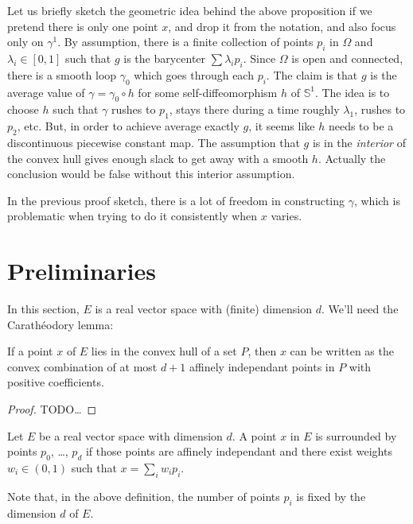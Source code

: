 Let us briefly sketch the geometric idea behind the above proposition
if we pretend there is only one point $x$, and drop it from the
notation, and also focus only on $γ^1$.
By assumption, there is a finite collection of points $p_i$ in $Ω$ and $λ_i ∈
[0, 1]$ such that $g$ is the barycenter $\sum λ_i p_i$. Since $Ω$ is open and
connected, there is a smooth loop $γ_0$ which goes through each $p_i$. The
claim is that $g$ is the average value of $γ = γ_0 ∘ h$ for some
self-diffeomorphism $h$ of $𝕊^1$. The idea is to choose $h$ such that
$γ$ rushes to $p_1$, stays there during a time roughly $λ_1$, rushes to
$p_2$, etc. But, in order to achieve average exactly $g$, it seems like $h$
needs to be a discontinuous piecewise constant map. The assumption that $g$ is
in the \emph{interior} of the convex hull gives enough slack to get away with
a smooth $h$.  Actually the
conclusion would be false without this interior assumption.

In the previous proof sketch, there is a lot of freedom in constructing $γ$,
which is problematic when trying to do it consistently when $x$ varies.

\section{Preliminaries}
\label{sec:preliminaries}

In this section, $E$ is a real vector space with (finite) dimension $d$.
We'll need the Carathéodory lemma:

\begin{lemma}
\label{lem:caratheodory}
  If a point $x$ of $E$ lies in the convex hull of a set $P$, then $x$
  can be written as the convex combination of at most $d + 1$ affinely
  independant points in $P$ with positive coefficients.
\end{lemma}

\begin{proof}
  TODO\dots
\end{proof}

\begin{definition}
  \label{def:surrounds_points}
  Let $E$ be a real vector space with dimension $d$. A point $x$ in $E$
  is surrounded by points $p_0$, \dots, $p_d$ if those points are
  affinely independant and there exist weights $w_i ∈ (0, 1)$ such
  that $x = \sum_i w_i p_i$.
\end{definition}

Note that, in the above definition, the number of points $p_i$ is fixed
by the dimension $d$ of $E$.

